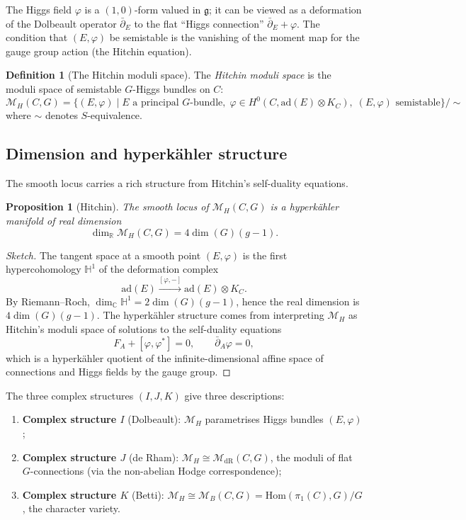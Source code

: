 \documentclass[11pt]{article}
\newtheorem{proposition}[theorem]{Proposition}
\theoremstyle{definition}
\newtheorem{definition}[theorem]{Definition}
\theoremstyle{remark}
\newcommand{\Hom}{\mathrm{Hom}}
\newcommand{\frakg}{\mathfrak{g}}
\newcommand{\cM}{\mathcal{M}}
\begin{document}
The Higgs field $\varphi$ is a $(1,0)$-form valued in $\frakg$; it can be viewed as a deformation of the Dolbeault operator $\bar\partial_E$ to the flat ``Higgs connection'' $\bar\partial_E + \varphi$. The condition that $(E, \varphi)$ be semistable is the vanishing of the moment map for the gauge group action (the Hitchin equation).

\begin{definition}[The Hitchin moduli space]
\label{def:hitchin-moduli}
The \emph{Hitchin moduli space} is the moduli space of semistable $G$-Higgs bundles on $C$:
\[
 \cM_H(C, G) = \bigl\{ (E, \varphi) \mid E \text{ a principal } G\text{-bundle}, \; \varphi \in H^0(C, \mathrm{ad}(E) \otimes K_C), \; (E, \varphi) \text{ semistable} \bigr\} / \sim
\]
where $\sim$ denotes $S$-equivalence.
\end{definition}

\subsection{Dimension and hyperk\"ahler structure}

The smooth locus carries a rich structure from Hitchin's self-duality equations.

\begin{proposition}[Hitchin]
\label{prop:hitchin-hk}
The smooth locus of $\cM_H(C, G)$ is a hyperk\"ahler manifold of real dimension
\[
 \dim_{\mathbb{R}} \cM_H(C, G) = 4 \dim(G)(g - 1).
\]
\end{proposition}

\begin{proof}[Sketch]
The tangent space at a smooth point $(E, \varphi)$ is the first hypercohomology $\mathbb{H}^1$ of the deformation complex
\[
 \mathrm{ad}(E) \xrightarrow{[\varphi, -]} \mathrm{ad}(E) \otimes K_C.
\]
By Riemann--Roch, $\dim_\mathbb{C} \mathbb{H}^1 = 2\dim(G)(g-1)$, hence the real dimension is $4\dim(G)(g-1)$. The hyperk\"ahler structure comes from interpreting $\cM_H$ as Hitchin's moduli space of solutions to the self-duality equations
\[
 F_A + [\varphi, \varphi^*] = 0, \qquad \bar\partial_A \varphi = 0,
\]
which is a hyperk\"ahler quotient of the infinite-dimensional affine space of connections and Higgs fields by the gauge group.
\end{proof}

The three complex structures $(I, J, K)$ give three descriptions:
\begin{enumerate}[label=(\roman*)]
 \item \textbf{Complex structure $I$} (Dolbeault): $\cM_H$ parametrises Higgs bundles $(E, \varphi)$;
 \item \textbf{Complex structure $J$} (de Rham): $\cM_H \cong \cM_{\mathrm{dR}}(C, G)$, the moduli of flat $G$-connections (via the non-abelian Hodge correspondence);
 \item \textbf{Complex structure $K$} (Betti): $\cM_H \cong \cM_B(C, G) = \Hom(\pi_1(C), G)/G$, the character variety.
\end{enumerate}
\end{document}
